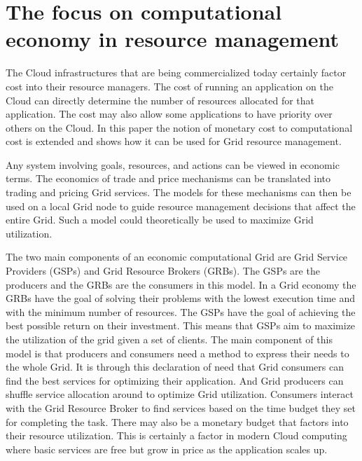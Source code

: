 \documentclass[conference]{IEEEtran}
\begin{document}
\section{\textbf{The focus on computational economy in resource management}}

The Cloud infrastructures that are being commercialized today certainly factor cost into their resource managers. The cost of running an application on the Cloud can directly determine the number of resources allocated for that application. The cost may also allow some applications to have priority over others on the Cloud. In this paper the notion of monetary cost to computational cost is extended and shows how it can be used for Grid resource management. 

Any system involving goals, resources, and actions can be viewed in economic terms. \cite{economygrid} The economics of trade and price mechanisms can be translated into trading and pricing Grid services. The models for these mechanisms can then be used on a local Grid node to guide resource management decisions that affect the entire Grid. Such a model could theoretically be used to maximize Grid utilization. 

The two main components of an economic computational Grid are Grid Service Providers (GSPs) and Grid Resource Brokers (GRBs). The GSPs are the producers and the GRBs are the consumers in this model. In a Grid economy the GRBs have the goal of solving their problems with the lowest execution time and with the minimum number of resources. The GSPs have the goal of achieving the best possible return on their investment. This means that GSPs aim to maximize the utilization of the grid given a set of clients. The main component of this model is that producers and consumers need a method to express their needs to the whole Grid. It is through this declaration of need that Grid consumers can find the best services for optimizing their application. And Grid producers can shuffle service allocation around to optimize Grid utilization. Consumers interact with the Grid Resource Broker to find services based on the time budget they set for completing the task. There may also be a monetary budget that factors into their resource utilization. This is certainly a factor in modern Cloud computing where basic services are free but grow in price as the application scales up. 
\end{document}

